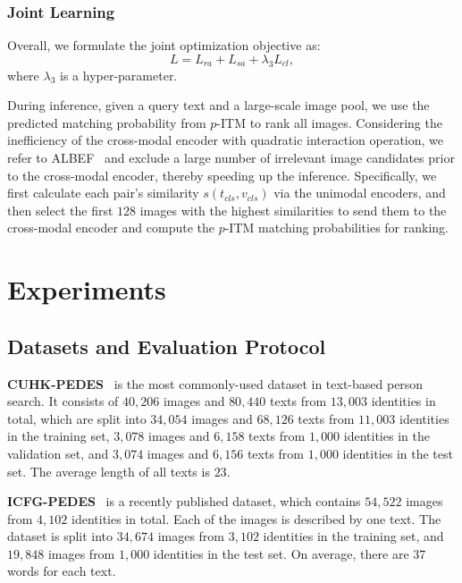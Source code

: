 \documentclass{article}
\begin{document}
\subsubsection{Joint Learning}
Overall, we formulate the joint optimization objective as:
\begin{equation}
    L = L_{ra} + L_{sa} + \lambda_3L_{cl}, \label{equ11}
\end{equation}
where $\lambda_3$ is a hyper-parameter.

During inference, given a query text and a large-scale image pool, we use the predicted matching probability from $p$-ITM to rank all images. 
Considering the inefficiency of the cross-modal encoder with quadratic interaction operation, we refer to ALBEF~\cite{NEURIPS2021_50525975} and exclude a large number of irrelevant image candidates prior to the cross-modal encoder, thereby speeding up the inference.
Specifically, we first calculate each pair's similarity $s(t_{cls}, v_{cls})$ via the unimodal encoders, and then select the first $128$ images with the highest similarities to send them to the cross-modal encoder and compute the $p$-ITM matching probabilities for ranking.


\section{Experiments}

\iffalse
\subsection{Datasets and Evaluation Protocol}
\textbf{CUHK-PEDES}~\cite{li2017person} is the most commonly-used dataset in text-based person search. It consists of $40,206$ images and $80,440$ texts from $13,003$ identities in total, which are split into $34,054$ images and $68,126$ texts from $11,003$ identities in the training set, $3,078$ images and $6,158$ texts from $1,000$ identities in the validation set, and $3,074$ images and $6,156$ texts from $1,000$ identities in the test set. The average length of all texts is $23$. 

\noindent\textbf{ICFG-PEDES}~\cite{ding2021semantically} is a recently published dataset, which contains $54,522$ images from $4,102$ identities in total. Each of the images is described by one text. The dataset is split into $34,674$ images from $3,102$ identities in the training set, and $19,848$ images from $1,000$ identities in the test set. On average, there are $37$ words for each text.
\end{document}
